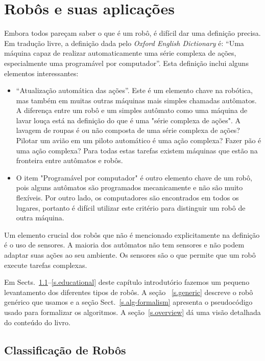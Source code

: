 
\chapter{Robôs e suas aplicações}\label{ch.basic}

Embora todos pareçam saber o que é um robô, é difícil dar uma definição precisa. Em tradução livre, a definição dada pelo \emph{Oxford English Dictionary} é: ``Uma máquina capaz de realizar automaticamente uma série complexa de ações, especialmente uma programável por computador''. Esta definição inclui alguns elementos interessantes:
\begin{itemize}
\item ``Atualização automática das ações''. Este é um elemento chave na robótica, mas também em muitas outras máquinas mais simples chamadas autômatos. A diferença entre um robô e um simples autômato como uma máquina de lavar louça está na definição do que é uma "série complexa de ações". A lavagem de roupas é ou não composta de uma série complexa de ações? Pilotar um avião em um piloto automático é uma ação complexa? Fazer pão é uma ação complexa? Para todas estas tarefas existem máquinas que estão na fronteira entre autômatos e robôs.
\item O item "Programável por computador" é outro elemento chave de um robô, pois alguns autômatos são programados mecanicamente e não são muito flexíveis. Por outro lado, os computadores são encontrados em todos os lugares, portanto é difícil utilizar este critério para distinguir um robô de outra máquina.
\end{itemize}
Um elemento crucial dos robôs que não é mencionado explicitamente na definição é o uso de sensores. A maioria dos autômatos não tem sensores e não podem adaptar suas ações ao seu ambiente. Os sensores são o que permite que um robô execute tarefas complexas. 

Em Sects.~\ref{s.classification}--\ref{s.educational} deste capítulo introdutório fazemos um pequeno levantamento dos diferentes tipos de robôs. A seção ~\ref{s.generic} descreve o robô genérico que usamos e a seção Sect.~\ref{s.alg-formalism} apresenta o pseudocódigo usado para formalizar os algoritmos. A seção~\ref{s.overview} dá uma visão detalhada do conteúdo do livro.

\section{Classificação de Robôs}\label{s.classification}

